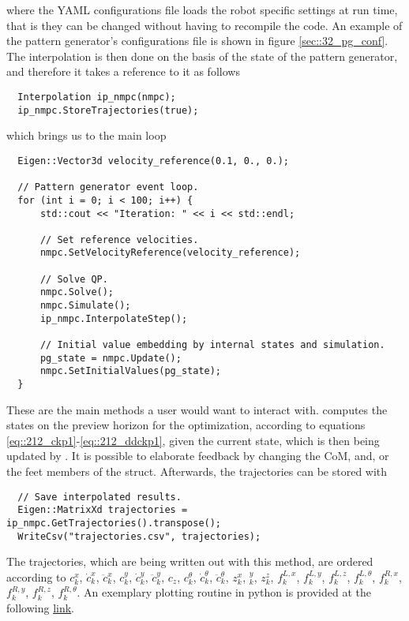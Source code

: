 where the YAML configurations file loads the robot specific settings at run time, that is they can be changed without having to recompile the code. An example of the pattern generator's configurations file is shown in figure \ref{sec::32_pg_conf}. The interpolation is then done on the basis of the state of the pattern generator, and therefore it takes a reference to it as follows
\begin{verbatim}
  Interpolation ip_nmpc(nmpc);
  ip_nmpc.StoreTrajectories(true);
\end{verbatim}
which brings us to the main loop
\begin{verbatim}
  Eigen::Vector3d velocity_reference(0.1, 0., 0.);

  // Pattern generator event loop.
  for (int i = 0; i < 100; i++) {
      std::cout << "Iteration: " << i << std::endl;

      // Set reference velocities.
      nmpc.SetVelocityReference(velocity_reference);

      // Solve QP.
      nmpc.Solve();
      nmpc.Simulate();
      ip_nmpc.InterpolateStep();

      // Initial value embedding by internal states and simulation.
      pg_state = nmpc.Update();
      nmpc.SetInitialValues(pg_state);
  }
\end{verbatim}
These are the main methods a user would want to interact with.  computes the states on the preview horizon for the optimization, according to equations \ref{eq::212_ckp1}-\ref{eq::212_ddckp1}, given the current state, which is then being updated by . It is possible to elaborate feedback by changing the CoM, and, or the feet members of the  struct. Afterwards, the trajectories can be stored with
\begin{verbatim}
  // Save interpolated results.
  Eigen::MatrixXd trajectories = ip_nmpc.GetTrajectories().transpose();
  WriteCsv("trajectories.csv", trajectories);
\end{verbatim}
The trajectories, which are being written out with this method, are ordered according to $c_k^x$, $\dot{c}_k^x$, $\ddot{c}_k^x$, $c_k^y$, $\dot{c}_k^y$, $\ddot{c}_k^y$, $c_z$, $c_k^\theta$, $\dot{c}_k^\theta$, $\ddot{c}_k^\theta$, $z_k^x$, $_k^y$, $z_k^z$, $f_k^{L,x}$, $f_k^{L,y}$, $f_k^{L,z}$, $f_k^{L,\theta}$, $f_k^{R,x}$, $f_k^{R,y}$, $f_k^{R,z}$, $f_k^{R,\theta}$. An exemplary plotting routine in python is provided at the following \href{https://github.com/mhubii/nmpc_pattern_generator/blob/719fde0bb73925923de85cbf379c5523e075dfeb/plot/plot_pattern.py#L15}{\underline{link}}.
